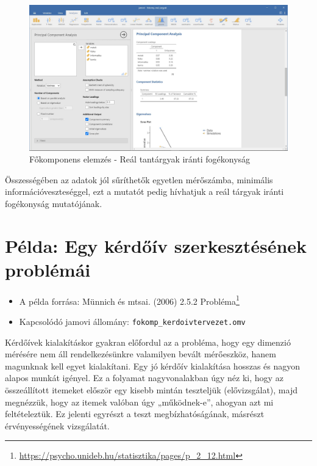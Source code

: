 \documentclass[
  letterpaper,
]{krantz}
\providecommand{\tightlist}{%
  \setlength{\itemsep}{0pt}\setlength{\parskip}{0pt}}\usepackage{longtable,booktabs,array}
\renewcommand{\href}[2]{#2\footnote{\url{#1}}}
\begin{document}
\begin{figure}

{\centering \includegraphics{./images/fokomponens_kep_07.jpg}

}

\caption{Főkomponens elemzés - Reál tantárgyak iránti fogékonyság}

\end{figure}

Összességében az adatok jól sűríthetők egyetlen mérőszámba, minimális
információveszteséggel, ezt a mutatót pedig hívhatjuk a reál tárgyak
iránti fogékonyság mutatójának.

\hypertarget{puxe9lda-egy-kuxe9rdux151uxedv-szerkesztuxe9suxe9nek-probluxe9muxe1i}{%
\section{Példa: Egy kérdőív szerkesztésének
problémái}\label{puxe9lda-egy-kuxe9rdux151uxedv-szerkesztuxe9suxe9nek-probluxe9muxe1i}}

\begin{itemize}
\tightlist
\item
  A példa forrása: Münnich és mtsai. (2006)
  \href{https://psycho.unideb.hu/statisztika/pages/p_2_12.html}{2.5.2
  Probléma}
\item
  Kapcsolódó jamovi állomány: \texttt{fokomp\_kerdoivtervezet.omv}
\end{itemize}

Kérdőívek kialakításkor gyakran előfordul az a probléma, hogy egy
dimenzió mérésére nem áll rendelkezésünkre valamilyen bevált mérőeszköz,
hanem magunknak kell egyet kialakítani. Egy jó kérdőív kialakítása
hosszas és nagyon alapos munkát igényel. Ez a folyamat nagyvonalakban
úgy néz ki, hogy az összeállított itemeket először egy kisebb mintán
teszteljük (elővizsgálat), majd megnézzük, hogy az itemek valóban úgy
„működnek-e'', ahogyan azt mi feltételeztük. Ez jelenti egyrészt a teszt
megbízhatóságának, másrészt érvényességének vizsgálatát.
\end{document}
